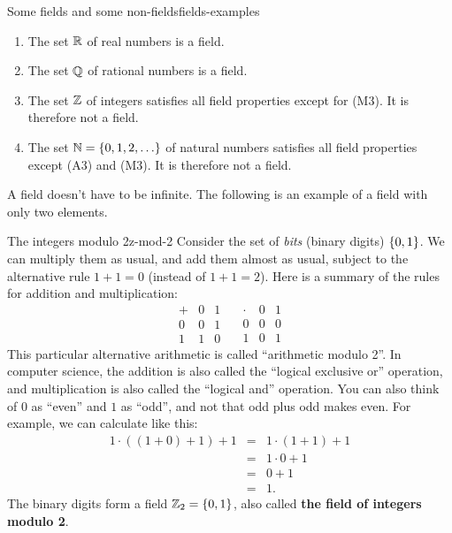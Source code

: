 \begin{example}{Some fields and some non-fields}{fields-examples}
  \begin{enumialphparenastyle}
    \begin{enumerate}
    \item The set $\mathbb{R}$ of real numbers is a field.
    \item The set $\mathbb{Q}$ of rational numbers is a field.
    \item The set $\mathbb{Z}$ of integers satisfies all field
      properties except for (M3). It is therefore not a field.
    \item The set $\mathbb{N}=\left\{0,1,2,\ldots\right\}$ of natural numbers
      satisfies all field properties except (A3) and (M3). It is
      therefore not a field.
    \end{enumerate}
  \end{enumialphparenastyle}
\end{example}

A field doesn't have to be infinite. The following is an example of a
field with only two elements.

\begin{example}{The integers modulo 2}{z-mod-2}
  Consider the set of {\em bits} (binary digits) $\left\{0,1\right\}$.
  We can multiply them as usual, and add them almost as usual, subject
  to the alternative rule $1+1=0$ (instead of $1+1=2$). Here is a
  summary of the rules for addition and multiplication:
  \begin{equation*}
    \begin{array}{l|ll}
      +&0&1 \\\hline
      0&0&1 \\
      1&1&0
    \end{array}
    \quad
    \begin{array}{l|ll}
      \cdot&0&1 \\\hline
      0&0&0 \\
      1&0&1
    \end{array}
  \end{equation*}
  This particular alternative arithmetic is called ``arithmetic modulo
  2''.  In computer science, the addition is also called the ``logical
  exclusive or'' operation, and
  multiplication is also called the ``logical and''
  operation. You can also think of $0$ as
  ``even'' and $1$ as ``odd'', and not that odd plus odd makes
  even. For example, we can calculate like this:
  \begin{equation*}
    \begin{array}{lll}
      1\cdot((1+0)+1) + 1 &=& 1\cdot(1+1) + 1\\
                          &=& 1\cdot 0 + 1\\
                          &=& 0 + 1\\
                          &=& 1.
    \end{array}
  \end{equation*}
  The binary digits form a field $\mathbb{Z}_2 = \left\{0,1\right\}$, also
  called \textbf{the field of integers modulo 2}.
\end{example}


